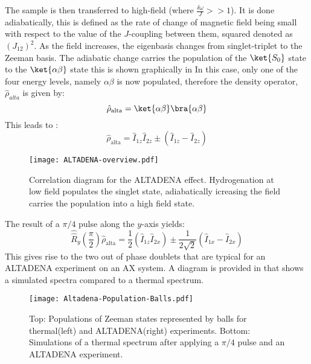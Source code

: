  The sample is then transferred to high-field (where $\frac{\delta{\omega}}{J}>>1$). It is done adiabatically, this is defined as the rate of change of magnetic field being small with respect to the value of the $J$-coupling between them, squared denoted as $(J_{12})^2$. As the field increases, the eigenbasis changes from singlet-triplet to the Zeeman basis. The adiabatic change carries the population of the $\ket{S_0}$ state to the $\ket{\alpha\beta}$ state this is shown graphically in  In this case, only one of the four energy levels, namely $\alpha\beta$ is now populated, therefore the density operator, $\hat{\rho}_{alta}$ is given by:
 \begin{equation}
   \hat{\rho}_{\text{alta}} = \ket{\alpha\beta}\bra{\alpha\beta}
 \end{equation}
  This leads to \citep{RN128}:
 \begin{equation}
   \hat{\rho}_{\text{alta}} = \hat{I}_{1z}\hat{I}_{2z}±(\hat{I}_{1z}-\hat{I}_{2z})
 \end{equation}

 \begin{figure}
   \begin{center}
   \texttt{[image: ALTADENA-overview.pdf]}
   \end{center}
   \caption{Correlation diagram for the ALTADENA effect. Hydrogenation at low field populates the singlet state, adiabatically icreasing the field carries the population into a high field state.}
   \label{fig:SingletTriplet}
 \end{figure}

 The result of a $\pi/4$ pulse along the $y$-axis yields:
 \begin{equation}
   \hat{\hat{R}}_y(\frac{\pi}{2})\hat{\rho}_{\text{alta}} = \frac{1}{2}(\hat{I}_{1z}\hat{I}_{2x})±\frac{1}{2\sqrt{2}}(\hat{I}_{1x}-\hat{I}_{2x})
 \end{equation}
 This gives rise to the two out of phase doublets that are typical for an ALTADENA experiment on an AX system. A diagram
 is provided in  that shows a simulated spectra compared to a thermal spectrum.

 \begin{figure}
   \begin{center}
   \texttt{[image: Altadena-Population-Balls.pdf]}
   \end{center}
   \caption{Top: Populations of Zeeman states represented by balls for thermal(left) and ALTADENA(right) experiments.
   Bottom: Simulations of a thermal spectrum after applying a $\pi/4$ pulse and an ALTADENA experiment.}
   \label{fig:ALTADENA}
 \end{figure}



